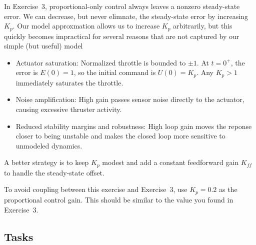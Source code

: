 \documentclass[11pt]{article}
\begin{document}
In Exercise~3, proportional-only control always leaves a nonzero steady-state
error.  We can decrease, but never elimnate, the steady-state error by increasing $K_p$.  Our model approxmation allows us to increase $K_p$ arbitrarily, but this quickly becomes impractical for several reasons that are not captured by our simple (but useful) model

\begin{itemize}
  \item Actuator saturation:  Normalized throttle is bounded to
        $\pm 1$.  At $t=0^+$, the error is $E(0)=1$, so the initial command is
        $U(0) = K_p$.  Any $K_p > 1$ immediately saturates the throttle.
  \item Noise amplification:  High gain passes sensor noise directly
        to the actuator, causing excessive thruster activity.
  \item Reduced stability margins and robustness:  High loop gain moves the reponse closer to being unstable and makes the closed loop more sensitive to unmodeled
        dynamics.
\end{itemize}

A better strategy is to keep $K_p$ modest and add a constant feedforward gain $K_{ff}$
to handle the steady-state offset.  


To avoid coupling between this exercise and Exercise~3, use $K_p = 0.2$ as the proportional control gain.  This should be similar to the value you found in Exercise~3.

\subsection*{Tasks}
\end{document}
